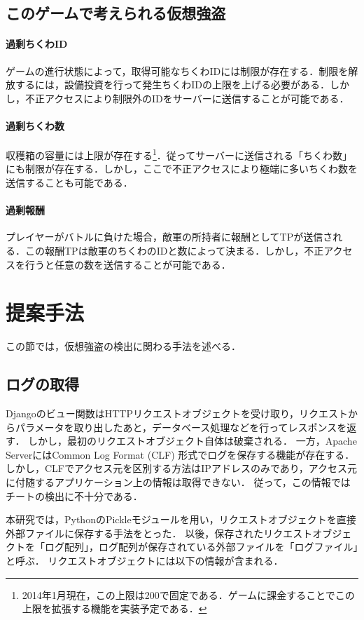 \documentclass[a4paper,11pt]{jsarticle}
\begin{document}
\subsection{このゲームで考えられる仮想強盗}
\paragraph{過剰ちくわID}
ゲームの進行状態によって，取得可能なちくわIDには制限が存在する．制限を解放するには，設備投資を行って発生ちくわIDの上限を上げる必要がある．しかし，不正アクセスにより制限外のIDをサーバーに送信することが可能である．

\paragraph{過剰ちくわ数}
収穫箱の容量には上限が存在する\footnote{2014年1月現在，この上限は200で固定である．ゲームに課金することでこの上限を拡張する機能を実装予定である．}．従ってサーバーに送信される「ちくわ数」にも制限が存在する．しかし，ここで不正アクセスにより極端に多いちくわ数を送信することも可能である．

\paragraph{過剰報酬}
プレイヤーがバトルに負けた場合，敵軍の所持者に報酬としてTPが送信される．この報酬TPは敵軍のちくわのIDと数によって決まる．しかし，不正アクセスを行うと任意の数を送信することが可能である．

\section{提案手法}
この節では，仮想強盗の検出に関わる手法を述べる．

\subsection{ログの取得}
Djangoのビュー関数はHTTPリクエストオブジェクトを受け取り，リクエストからパラメータを取り出したあと，データベース処理などを行ってレスポンスを返す．
しかし，最初のリクエストオブジェクト自体は破棄される．
一方，Apache ServerにはCommon Log Format\cite{clf} (CLF) 形式でログを保存する機能が存在する．
しかし，CLFでアクセス元を区別する方法はIPアドレスのみであり，アクセス元に付随するアプリケーション上の情報は取得できない．
従って，この情報ではチートの検出に不十分である．

本研究では，PythonのPickleモジュール\cite{pickle}を用い，リクエストオブジェクトを直接外部ファイルに保存する手法をとった．
以後，保存されたリクエストオブジェクトを「ログ配列」，ログ配列が保存されている外部ファイルを「ログファイル」と呼ぶ．
リクエストオブジェクトには以下の情報が含まれる．
\end{document}
